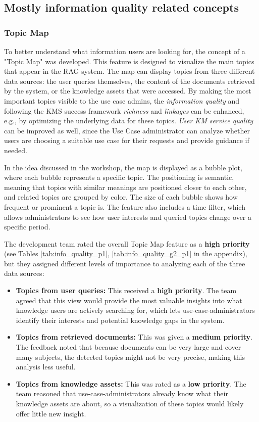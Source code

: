 \documentclass[
	english,
	ruledheaders=section,%
	class=report,%
	thesis={type=bachelor},%
	accentcolor=1b,%
	custommargins=true,%
	marginpar=false,%
	parskip=half-,%
	fontsize=11pt,%
	DIV=14,
]{tudapub}
\begin{document}
\subsection{Mostly information quality related concepts}
\subsubsection{Topic Map}
To better understand what information users are looking for, the concept of a "Topic Map" was developed. This feature is designed to visualize the main topics that appear in the RAG system. The map can display topics from three different data sources: the user queries themselves, the content of the documents retrieved by the system, or the knowledge assets that were accessed. By making the most important topics visible to the use case admins, the \textit{information quality} and following the KMS success framework \textit{richness} and \textit{linkages} \parencite[pp.~57--58]{Jennex2006} can be enhanced, e.g., by optimizing the underlying data for these topics. \textit{User KM service quality} \parencite[pp.~58--59]{Jennex2006} can be improved as well, since the Use Case administrator can analyze whether users are choosing a suitable use case for their requests and provide guidance if needed.

In the idea discussed in the workshop, the map is displayed as a bubble plot, where each bubble represents a specific topic. The positioning is semantic, meaning that topics with similar meanings are positioned closer to each other, and related topics are grouped by color. The size of each bubble shows how frequent or prominent a topic is. The feature also includes a time filter, which allows administrators to see how user interests and queried topics change over a specific period.

The development team rated the overall Topic Map feature as a \textbf{high priority} (see Tables  \ref{tab:info_quality_p1}, \ref{tab:info_quality_g2_p1} in the appendix), but they assigned different levels of importance to analyzing each of the three data sources:

\begin{itemize}
    \item \textbf{Topics from user queries:} This received a \textbf{high priority}. The team agreed that this view would provide the most valuable insights into what knowledge users are actively searching for, which lets use-case-administrators identify their interests and potential knowledge gaps in the system.
    
    \item \textbf{Topics from retrieved documents:} This was given a \textbf{medium priority}. The feedback noted that because documents can be very large and cover many subjects, the detected topics might not be very precise, making this analysis less useful.
    
    \item \textbf{Topics from knowledge assets:} This was rated as a \textbf{low priority}. The team reasoned that use-case-administrators already know what their knowledge assets are about, so a visualization of these topics would likely offer little new insight.
\end{itemize}
\end{document}
